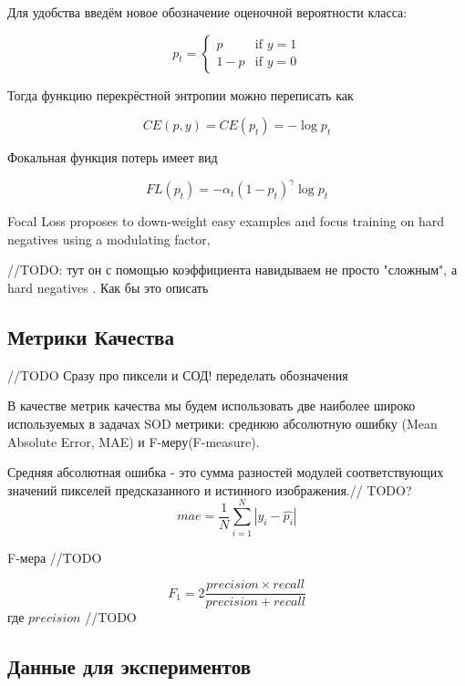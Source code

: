 Для удобства введём новое обозначение оценочной вероятности класса:

\begin{equation}
    p_t=\begin{cases}
        p & \text{if }y=1\\
        1-p & \text{if }y=0
     \end{cases}
\end{equation}

Тогда функцию перекрёстной энтропии можно переписать как

\begin{equation}
    CE(p,y) = CE(p_t) = -\log{p_t}
\end{equation}

Фокальная функция потерь имеет вид

\begin{equation}
    FL(p_t) = -\alpha_t(1-p_t)^{\gamma}\log{p_t}
\end{equation}
 

Focal Loss proposes to down-weight easy examples and focus
training on hard negatives using a modulating factor,

//TODO: тут он с помощью коэффициента навидываем не просто "сложным", 
а hard negatives . Как бы это описать 


\subsection{Метрики Качества}

//TODO  Сразу про пиксели и СОД! переделать обозначения

В качестве метрик качества мы будем использовать две наиболее широко используемых в задачах SOD метрики: 
среднюю абсолютную ошибку (Mean Absolute Error, MAE) и F-меру(F-measure).

Средняя абсолютная ошибка - это сумма разностей модулей соответствующих значений пикселей предсказанного и истинного изображения.// TODO?
\begin{equation}
    mae = \frac{1}{N}\sum_{i=1}^N|y_i - \hat{p_i}|
\end{equation}

F-мера //TODO

\begin{equation}
    F_1 = 2\frac{precision \times recall}{precision + recall}
\end{equation}
где $precision$ //TODO

\subsection{Данные для экспериментов}


